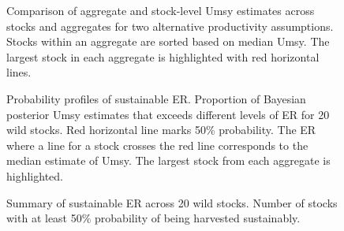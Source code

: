 \documentclass[french,11pt]{book}
\begin{document}
\clearpage


\begin{figure}[htb]

{\centering {} 

}

\caption{Comparison of aggregate and stock-level Umsy estimates across stocks and aggregates for two alternative productivity assumptions. Stocks within an aggregate are sorted based on median Umsy. The largest stock in each aggregate is highlighted with red horizontal lines.}\label{fig:AggUmsy}
\end{figure}
\clearpage


\begin{figure}[htb]

{\centering {} 

}

\caption{Probability profiles of sustainable ER. Proportion of Bayesian posterior Umsy estimates that exceeds different levels of ER for 20 wild stocks. Red horizontal line marks 50\% probability. The ER where a line for a stock crosses the red line corresponds to the median estimate of Umsy. The largest stock from each aggregate is highlighted.}\label{fig:UmsyProfiles1}
\end{figure}
\clearpage


\begin{figure}[htb]

{\centering {} 

}

\caption{Summary of sustainable ER across 20 wild stocks. Number of stocks with at least 50\% probability of being harvested sustainably.}\label{fig:UmsyProfiles2}
\end{figure}
\clearpage
\end{document}
